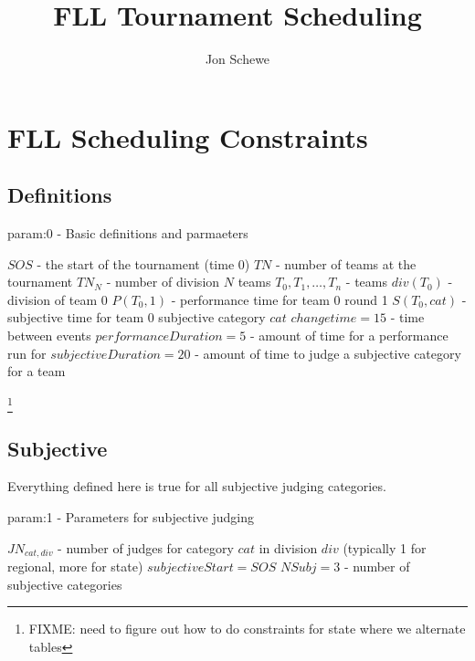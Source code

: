 \documentclass[letterpaper,11pt]{report}
\title{FLL Tournament Scheduling}
\author{Jon Schewe}
\newcommand{\doccomment}[3]%
{\marginpar{\textcolor{#2}{\bf #1}}%
\footnote{{\color{#2}#3}}%
}
\newcommand{\doccomment}[3]{}
\newcommand{\jpscomment}[1]%
{\doccomment{SCHEWE}{Bittersweet}{#1}}
\begin{document}
\maketitle

\chapter{FLL Scheduling Constraints}

\section{Definitions}

\begin{algorithm}
\caption{param:0 - Basic definitions and parmaeters}
\begin{algorithmic}
\STATE $SOS$ - the start of the tournament (time 0)
\STATE $TN$ - number of teams at the tournament
\STATE $TN_{N}$ - number of division $N$ teams
\STATE $T_{0}, T_{1}, \dots, T_{n}$ - teams
\STATE $div(T_{0})$ - division of team 0
\STATE $P(T_{0}, 1)$ - performance time for team 0 round 1
\STATE $S(T_{0}, cat)$ - subjective time for team 0 subjective category $cat$
\STATE $changetime = 15$ - time between events
\STATE $performanceDuration = 5$ - amount of time for a performance run for
\STATE $subjectiveDuration = 20$ - amount of time to judge a subjective
category for a team
\end{algorithmic}
\end{algorithm}
\jpscomment{FIXME: need to figure out how to do constraints for state where we
alternate tables}

\FloatBarrier
\section{Subjective}

Everything defined here is true for all subjective judging categories.

\begin{algorithm}
\caption{param:1 - Parameters for subjective judging}
\begin{algorithmic}
\STATE $JN_{cat,div}$ - number of judges for category $cat$ in division
$div$ (typically 1 for regional, more for state)
\STATE $subjectiveStart = SOS$
\STATE $NSubj = 3$ - number of subjective categories
\end{algorithmic}
\end{algorithm}
\end{document}

